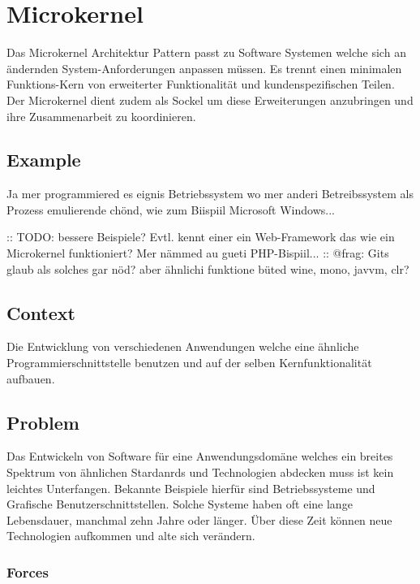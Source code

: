 \section{Microkernel}


Das Microkernel Architektur Pattern passt zu Software Systemen welche sich an ändernden System-Anforderungen anpassen müssen. Es trennt einen minimalen Funktions-Kern von erweiterter Funktionalität und kundenspezifischen Teilen. Der Microkernel dient zudem als Sockel um diese Erweiterungen anzubringen und ihre Zusammenarbeit zu koordinieren.

\subsection*{Example}


Ja mer programmiered es eignis Betriebssystem wo mer anderi Betreibssystem als Prozess emulierende chönd, wie zum Biispiil Microsoft Windows...

:: TODO: bessere Beispiele? Evtl. kennt einer ein Web-Framework das wie ein Microkernel funktioniert? Mer nämmed au gueti PHP-Bispiil... ::
@frag:
Gits glaub als solches gar nöd? aber ähnlichi funktione büted wine, mono, javvm, clr?

\subsection*{Context}


Die Entwicklung von verschiedenen Anwendungen welche eine ähnliche Programmierschnittstelle benutzen und auf der selben Kernfunktionalität aufbauen.

\subsection*{Problem}


Das Entwickeln von Software für eine Anwendungsdomäne welches ein breites Spektrum von ähnlichen Stardanrds und Technologien abdecken muss ist kein leichtes Unterfangen. Bekannte Beispiele hierfür sind Betriebssysteme und Grafische Benutzerschnittstellen. Solche Systeme haben oft eine lange Lebensdauer, manchmal zehn Jahre oder länger. Über diese Zeit können neue Technologien aufkommen und alte sich verändern.

\subsubsection*{Forces}



